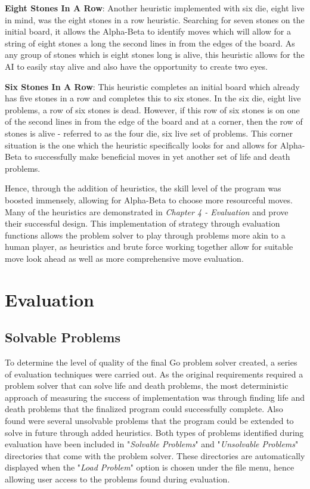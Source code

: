 \documentclass{l3proj}
\begin{document}
\textbf{Eight Stones In A Row}: Another heuristic implemented with six die, eight live in mind, was the eight stones in a row heuristic. Searching for seven stones on the initial board, it allows the Alpha-Beta to identify moves which will allow for a string of eight stones a long the second lines in from the edges of the board. As any group of stones which is eight stones long is alive, this heuristic allows for the AI to easily stay alive and also have the opportunity to create two eyes.

\textbf{Six Stones In A Row}: This heuristic completes an initial board which already has five stones in a row and completes this to six stones. In the six die, eight live problems, a row of six stones is dead. However, if this row of six stones is on one of the second lines in from the edge of the board and at a corner, then the row of stones is alive - referred to as the four die, six live set of problems. This corner situation is the one which the heuristic specifically looks for and allows for Alpha-Beta to successfully make beneficial moves in yet another set of life and death problems.

Hence, through the addition of heuristics, the skill level of the program was boosted immensely, allowing for Alpha-Beta to choose more resourceful moves. Many of the heuristics are demonstrated in \textit{Chapter 4 - Evaluation} and prove their successful design. This implementation of strategy through evaluation functions allows the problem solver to play through problems more akin to a human player, as heuristics and brute force working together allow for suitable move look ahead as well as more comprehensive move evaluation.

\chapter{Evaluation}
\label{evaluation}

\section{Solvable Problems}

To determine the level of quality of the final Go problem solver created, a series of evaluation techniques were carried out. As the original requirements required a problem solver that can solve life and death problems, the most deterministic approach of measuring the success of implementation was through finding life and death problems that the finalized program could successfully complete. Also found were several unsolvable problems that the program could be extended to solve in future through added heuristics. Both types of problems identified during evaluation have been included in "\textit{Solvable Problems}" and "\textit{Unsolvable Problems}" directories that come with the problem solver. These directories are automatically displayed when the "\textit{Load Problem}" option is chosen under the file menu, hence allowing user access to the problems found during evaluation.
\end{document}

